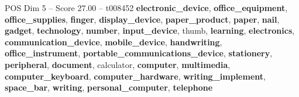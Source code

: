 \begin{textsample}{POS Dim 5 – Score 27.00 – t008452}  \label{ex:f5_pos_028}
\textbf{electronic\_device}, \textbf{office\_equipment}, \textbf{office\_supplies}, \textbf{finger}, \textbf{display\_device}, \textbf{paper\_product}, \textbf{paper}, \textbf{nail}, \textbf{gadget}, \textbf{technology}, \textbf{number}, \textbf{input\_device}, thumb, \textbf{learning}, \textbf{electronics}, \textbf{communication\_device}, \textbf{mobile\_device}, \textbf{handwriting}, \textbf{office\_instrument}, \textbf{portable\_communications\_device}, \textbf{stationery}, \textbf{peripheral}, \textbf{document}, calculator, \textbf{computer}, \textbf{multimedia}, \textbf{computer\_keyboard}, \textbf{computer\_hardware}, \textbf{writing\_implement}, \textbf{space\_bar}, \textbf{writing}, \textbf{personal\_computer}, \textbf{telephone}

\end{textsample}
